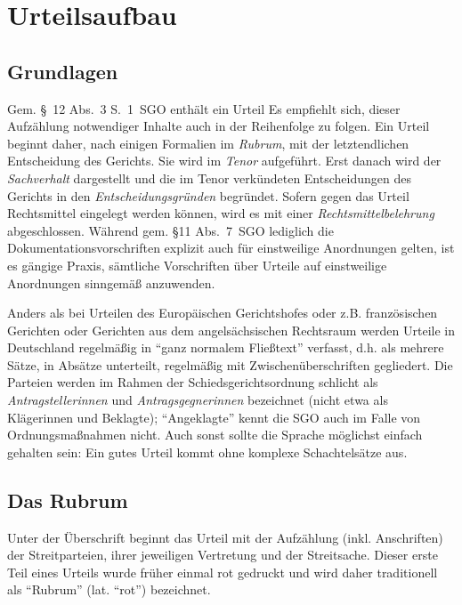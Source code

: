
\chapter{Urteilsaufbau}

\section{Grundlagen}
Gem. \S~12 Abs.~3 S.~1~SGO enthält ein Urteil  Es empfiehlt sich, dieser Aufzählung notwendiger Inhalte auch in der Reihenfolge zu folgen. Ein Urteil beginnt daher, nach einigen Formalien im \emph{Rubrum}, mit der letztendlichen Entscheidung des Gerichts. Sie wird im \emph{Tenor} aufgeführt. Erst danach wird der \emph{Sachverhalt} dargestellt und die im Tenor verkündeten Entscheidungen des Gerichts in den \emph{Entscheidungsgründen} begründet. Sofern gegen das Urteil Rechtsmittel eingelegt werden können, wird es mit einer \emph{Rechtsmittelbelehrung} abgeschlossen. Während gem. \S11 Abs.~7~SGO lediglich die Dokumentationsvorschriften explizit auch für einstweilige Anordnungen gelten, ist es gängige Praxis, sämtliche Vorschriften über Urteile auf einstweilige Anordnungen sinngemäß anzuwenden.

Anders als bei Urteilen des Europäischen Gerichtshofes oder z.B. französischen Gerichten oder Gerichten aus dem angelsächsischen Rechtsraum werden Urteile in Deutschland regelmäßig in \enquote{ganz normalem Fließtext} verfasst, d.h. als mehrere Sätze, in Absätze unterteilt, regelmäßig mit Zwischenüberschriften gegliedert. Die Parteien werden im Rahmen der Schiedsgerichtsordnung schlicht als \emph{Antragstellerinnen} und \emph{Antragsgegnerinnen} bezeichnet (nicht etwa als Klägerinnen und Beklagte); \enquote{Angeklagte} kennt die SGO auch im Falle von Ordnungsmaßnahmen nicht. Auch sonst sollte die Sprache möglichst einfach gehalten sein: Ein gutes Urteil kommt ohne komplexe Schachtelsätze aus.

\section{Das Rubrum}
Unter der Überschrift  beginnt das Urteil mit der Aufzählung (inkl. Anschriften) der Streitparteien, ihrer jeweiligen Vertretung und der Streitsache. Dieser erste Teil eines Urteils wurde früher einmal rot gedruckt und wird daher traditionell als \enquote{Rubrum} (lat. \enquote{rot}) bezeichnet.

